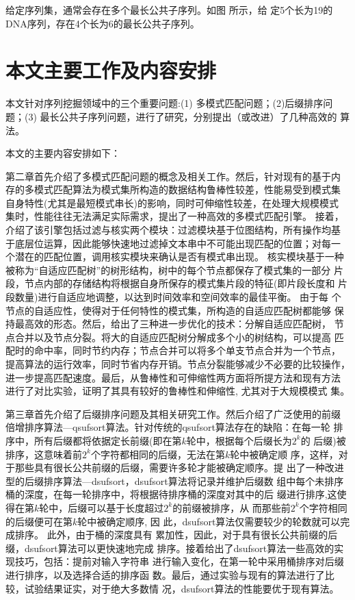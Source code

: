 给定序列集，通常会存在多个最长公共子序列。如图 \cite{fig:MLCS}所示，给
定5个长为19的DNA序列，存在4个长为6的最长公共子序列。



\section{本文主要工作及内容安排}
\label{sec:org}

本文针对序列挖掘领域中的三个重要问题:(1) 多模式匹配问题；(2)后缀排序问
题；(3) 最长公共子序列问题，进行了研究，分别提出（或改进）了几种高效的
算法。

本文的主要内容安排如下：

第二章首先介绍了多模式匹配问题的概念及相关工作。然后，针对现有的基于内
存的多模式匹配算法为模式集所构造的数据结构鲁棒性较差，性能易受到模式集
自身特性(尤其是最短模式串长)的影响，同时可伸缩性较差，在处理大规模模式
集时，性能往往无法满足实际需求，提出了一种高效的多模式匹配引擎。 接着，
介绍了该引擎包括过滤与核实两个模块：过滤模块基于位图结构，所有操作均基
于底层位运算，因此能够快速地过滤掉文本串中不可能出现匹配的位置；对每一
个潜在的匹配位置，调用核实模块来确认是否有模式串出现。 核实模块基于一种
被称为“自适应匹配树”的树形结构，树中的每个节点都保存了模式集的一部分
片段，节点内部的存储结构将根据自身所保存的模式集片段的特征(即片段长度和
片段数量)进行自适应地调整，以达到时间效率和空间效率的最佳平衡。 由于每
个节点的自适应性，使得对于任何特性的模式集，所构造的自适应匹配树都能够
保持最高效的形态。然后，给出了三种进一步优化的技术：分解自适应匹配树，
节点合并以及节点分裂。将大的自适应匹配树分解成多个小的树结构，可以提高
匹配时的命中率，同时节约内存；节点合并可以将多个单支节点合并为一个节点，
提高算法的运行效率，同时节省内存开销。节点分裂能够减少不必要的比较操作，
进一步提高匹配速度。最后，从鲁棒性和可伸缩性两方面将所提方法和现有方法
进行了对比实验，证明了其具有较好的鲁棒性和伸缩性, 尤其对于大规模模式
集。

第三章首先介绍了后缀排序问题及其相关研究工作。然后介绍了广泛使用的前缀
倍增排序算法---qsufsort算法。针对传统的qsufsort算法存在的缺陷：在每一轮
排序中，所有后缀都将依据定长前缀(即在第$k$轮中，根据每个后缀长为$2^k$的
后缀)被排序，这意味着前$2^k$个字符都相同的后缀，无法在第$k$轮中被确定顺
序，这样，对于那些具有很长公共前缀的后缀，需要许多轮才能被确定顺序。提
出了一种改进型的后缀排序算法---dsufsort，dsufsort算法将记录并维护后缀数
组中每个未排序桶的深度，在每一轮排序中，将根据待排序桶的深度对其中的后
缀进行排序,这使得在第$k$轮中，后缀可以基于长度超过$2^k$的前缀被排序，从
而那些前$2^k$个字符相同的后缀便可在第$k$轮中被确定顺序, 因
此，dsufsort算法仅需要较少的轮数就可以完成排序。 此外，由于桶的深度具有
累加性，因此，对于具有很长公共前缀的后缀，dsufsort算法可以更快速地完成
排序。接着给出了dsufsort算法一些高效的实现技巧，包括：提前对输入字符串
进行输入变化，在第一轮中采用桶排序对后缀进行排序，以及选择合适的排序函
数。最后，通过实验与现有的算法进行了比较，试验结果证实，对于绝大多数情
况，dsufsort算法的性能要优于现有算法。

